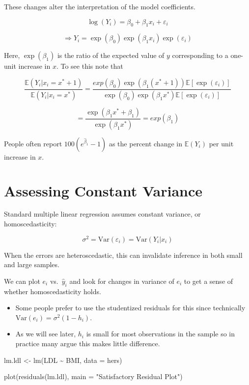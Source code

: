 \documentclass[
  letterpaper,
  DIV=11,
  numbers=noendperiod]{scrreport}
\newenvironment{Shaded}{\begin{snugshade}}{\end{snugshade}}
\newcommand{\AttributeTok}[1]{\textcolor[rgb]{0.40,0.45,0.13}{#1}}
\newcommand{\FunctionTok}[1]{\textcolor[rgb]{0.28,0.35,0.67}{#1}}
\newcommand{\NormalTok}[1]{\textcolor[rgb]{0.00,0.23,0.31}{#1}}
\newcommand{\OtherTok}[1]{\textcolor[rgb]{0.00,0.23,0.31}{#1}}
\newcommand{\SpecialCharTok}[1]{\textcolor[rgb]{0.37,0.37,0.37}{#1}}
\newcommand{\StringTok}[1]{\textcolor[rgb]{0.13,0.47,0.30}{#1}}
\providecommand{\tightlist}{%
  \setlength{\itemsep}{0pt}\setlength{\parskip}{0pt}}\usepackage{longtable,booktabs,array}
\begin{document}
These changes alter the interpretation of the model coefficients.

\[\log(Y_i) = \beta_0 + \beta_1 x_i + \varepsilon_i\]

\[\Longrightarrow Y_i = \exp(\beta_0) \exp(\beta_1 x_i) \exp(\varepsilon_i)\]

Here, \(\exp(\beta_1)\) is the ratio of the expected value of \(y\)
corresponding to a one-unit increase in \(x\). To see this note that

\[\frac{\mathbb E(Y_i | x_i = x^*+1)}{\mathbb E(Y_i | x_i = x^*)} = \frac{exp(\beta_0)\exp(\beta_1(x^*+1)) \mathbb E[\exp(\varepsilon_i)]}{\exp(\beta_0)\exp(\beta_1 x^*) \mathbb E[\exp(\varepsilon_i)]}\]

\[ = \frac{\exp(\beta_1x^* + \beta_1)}{\exp(\beta_1 x^*)} = exp(\beta_1)\]

People often report \(100(e^{\hat \beta_1} - 1)\) as the percent change
in \(\mathbb E(Y_i)\) per unit increase in \(x\).

\hypertarget{assessing-constant-variance}{%
\section{Assessing Constant
Variance}\label{assessing-constant-variance}}

Standard multiple linear regression assumes constant variance, or
{homoscedasticity}:

\[\sigma^2 = \text{Var}(\varepsilon_i) = \text{Var}(Y_i | x_i)\]

When the errors are heteroscedastic, this can invalidate inference in
both small and large samples.

We can plot \(e_i\) vs.~\(\hat y_i\) and look for changes in variance of
\(e_i\) to get a sense of whether homoscedasticity holds.

\begin{itemize}
\tightlist
\item
  Some people prefer to use the studentized residuals for this since
  technically \(\text{Var}(e_i) = \sigma^2(1-h_i)\).
\item
  As we will see later, \(h_i\) is small for most observations in the
  sample so in practice many argue this makes little difference.
\end{itemize}

\begin{Shaded}
\begin{Highlighting}[]
\NormalTok{lm.ldl }\OtherTok{\textless{}{-}} \FunctionTok{lm}\NormalTok{(LDL }\SpecialCharTok{\textasciitilde{}}\NormalTok{ BMI, }\AttributeTok{data =}\NormalTok{ hers)}

\FunctionTok{plot}\NormalTok{(}\FunctionTok{residuals}\NormalTok{(lm.ldl), }\AttributeTok{main =} \StringTok{"Satisfactory Residual Plot"}\NormalTok{)}
\end{Highlighting}
\end{Shaded}
\end{document}
